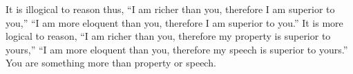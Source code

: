 It is illogical to reason thus, ``I am richer than you, therefore I am superior
to you,'' ``I am  more eloquent than you, therefore I am  superior to you.'' It
is more  logical to reason,  ``I am richer than  you, therefore my  property is
superior to  yours,'' ``I  am more  eloquent than you,  therefore my  speech is
superior to yours.'' You are something more than property or speech.
